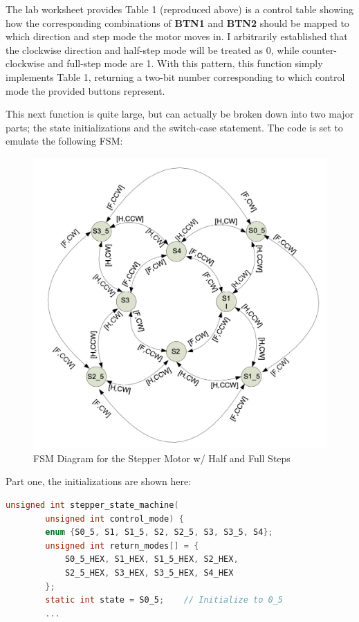 \documentclass[a4paper, 12pt]{article}
\begin{document}
The lab worksheet provides Table 1 (reproduced above) is a control table showing how the corresponding combinations of \textbf{BTN1} and \textbf{BTN2} should be mapped to which direction and step mode the motor moves in. I arbitrarily established that the clockwise direction and half-step mode will be treated as 0, while counter-clockwise and full-step mode are 1. With this pattern, this function simply implements Table 1, returning a two-bit number corresponding to which control mode the provided buttons represent.

This next function is quite large, but can actually be broken down into two major parts; the state initializations and the switch-case statement. The code is set to emulate the following FSM:

\begin{figure}[h]
\centering
\includegraphics[width=1\textwidth]{FSM}
\caption{FSM Diagram for the Stepper Motor w/ Half and Full Steps}
\end{figure}

Part one, the initializations are shown here:

	\begin{mdframed}[backgroundcolor=code-gray, roundcorner=10pt,
								innerleftmargin=5, innertopmargin=5, innerbottommargin=5]	
	\begin{lstlisting}[language=C, caption=State Machine Initialization, tabsize=2]
	unsigned int stepper_state_machine(
		unsigned int control_mode) {
		enum {S0_5, S1, S1_5, S2, S2_5, S3, S3_5, S4};
		unsigned int return_modes[] = {
			S0_5_HEX, S1_HEX, S1_5_HEX, S2_HEX,
			S2_5_HEX, S3_HEX, S3_5_HEX, S4_HEX
		};
		static int state = S0_5;	// Initialize to 0_5
		...
	\end{lstlisting}
	\end{mdframed}
	
\end{document}
